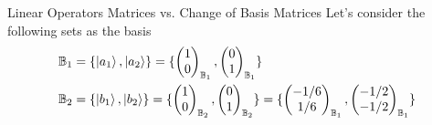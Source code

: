 \begin{example}{Linear Operators Matrices vs. Change of Basis Matrices}
	Let's consider the following sets as the basis
	\begin{align*}
		\mathbb{B}_1 &= \{ \ket{a_1}, \ket{a_2} \} = \{ 
		\begin{pmatrix}
			1 \\
			0
		\end{pmatrix}_{\mathbb{B}_1},
		\begin{pmatrix}
			0 \\
			1
		\end{pmatrix}_{\mathbb{B}_1}
		\} \\
		\mathbb{B}_2 &= \{ \ket{b_1}, \ket{b_2} \} = \{ 
		\begin{pmatrix}
			1 \\
			0
		\end{pmatrix}_{\mathbb{B}_2},
		\begin{pmatrix}
			0 \\
			1
		\end{pmatrix}_{\mathbb{B}_2}
		\} = 
		\{ 
		\begin{pmatrix}
			-1/6 \\
			1/6
		\end{pmatrix}_{\mathbb{B}_1},
		\begin{pmatrix}
			-1/2 \\
			-1/2
		\end{pmatrix}_{\mathbb{B}_1}
		\}
	\end{align*}
	
	
	
	
\end{example}






